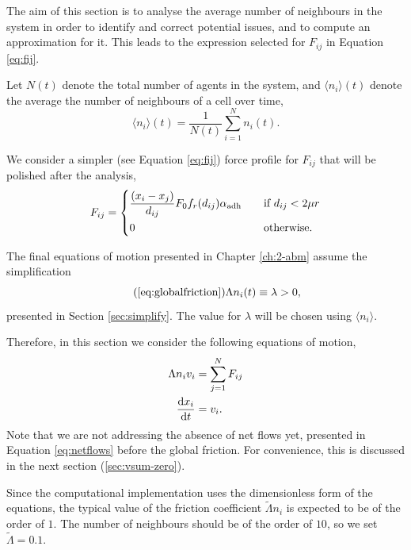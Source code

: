 The aim of this section is to analyse the average number of neighbours in the system in order to identify and correct potential issues, and to compute an approximation for it. This leads to the expression selected for $F_{ij}$ in Equation \ref{eq:fij}.

Let $N(t)$ denote the total number of agents in the system, and $\langle n_i \rangle (t)$ denote the average the number of neighbours of a cell over time,
\begin{equation}
    \langle n_i \rangle (t) = \frac{1}{N(t)}\sum_{i=1}^N{n_i(t)}.
\end{equation}

We consider a simpler (see Equation \ref{eq:fij}) force profile for $F_{ij}$ that will be polished after the analysis,
\begin{equation}\label{eq:badforce}
    F_{ij}= 
    \begin{dcases}
        \frac{(x_i-x_j)}{d_{ij}}F_0 f_r(d_{ij})\alpha_\text{adh}
        &\quad \text{if $d_{ij} < 2\mu r$}        \\
        0 &\quad \text{otherwise.}
    \end{dcases}
\end{equation}

The final equations of motion presented in Chapter \ref{ch:2-abm} assume the simplification
\begin{equation}\tag{\ref{eq:globalfriction}}
    \Lambda n_i(t)\equiv \lambda>0,
\end{equation}
presented in Section \ref{sec:simplify}. The value for $\lambda$ will be chosen using $\langle n_i \rangle$.

Therefore, in this section we consider the following equations of motion,
\begin{align}\label{eq:motion_variable}
    \begin{aligned}
        \Lambda n_i v_i &= \sum_{j=1}^{N} F_{ij}\\
        \frac{\mathrm{d} x_i}{\mathrm{d} t} &=v_i.
    \end{aligned}
\end{align}
Note that we are not addressing the absence of net flows yet, presented in Equation \ref{eq:netflows} before the global friction. For convenience, this is discussed in the next section (\ref{sec:vsum-zero}).

Since the computational implementation uses the dimensionless form of the equations, the typical value of the friction coefficient $\tilde\Lambda n_i$ is expected to be of the order of $1$. The number of neighbours should be of the order of $10$, so we set $\tilde\Lambda=0.1$. 


